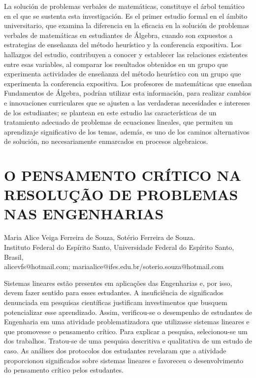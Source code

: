 La solución de problemas verbales de matemáticas, constituye el árbol
temático en el que se sustenta esta investigación. Es el primer estudio
formal en el ámbito universitario, que examina la diferencia en la
eficacia en la solución de problemas verbales de matemáticas en estudiantes
de Álgebra, cuando son expuestos a estrategias de enseñanza del método
heurístico y la conferencia expositiva. Los hallazgos del estudio,
contribuyen a conocer y establecer las relaciones existentes entre
esas variables, al comparar los resultados obtenidos en un grupo que
experimenta actividades de enseñanza del método heurístico con un
grupo que experimenta la conferencia expositiva. Los profesores de
matemáticas que enseñan Fundamentos de Álgebra, podrían utilizar esta
información, para realizar cambios e innovaciones curriculares que
se ajusten a las verdaderas necesidades e intereses de los estudiantes;
se plantean en este estudio las características de un tratamiento
adecuado de problemas de ecuaciones lineales, que permiten un aprendizaje
significativo de los temas, además, es uno de los caminos alternativos
de solución, no necesariamente enmarcados en procesos algebraicos. 


\section{O PENSAMENTO CRÍTICO NA RESOLUÇÃO DE PROBLEMAS NAS ENGENHARIAS}

\begin{datos}
Maria Alice Veiga Ferreira de Souza, Sotério Ferreira de Souza.\\
Instituto Federal do Espírito Santo, Universidade Federal do Espírito Santo,\\
Brasil,\\
\hfill  alicevfs@hotmail.com; mariaalice@ifes.edu.br/soterio.souza@hotmail.com 
\end{datos}

Sistemas lineares estão presentes em aplicações das Engenharias e,
por isso, devem fazer sentido para esses estudantes. A insuficiência
de significados denunciada em pesquisas científicas justificam investimentos
que busquem potencializar esse aprendizado. Assim, verificou-se o
desempenho de estudantes de Engenharia em uma atividade problematizadora
que utilizasse sistemas lineares e que promovesse o pensamento crítico.
Para explicar a pesquisa, selecionou-se um dos trabalhos. Tratou-se
de uma pesquisa descritiva e qualitativa de um estudo de caso. As
análises dos protocolos dos estudantes revelaram que a atividade proporcionou
significados sobre sistemas lineares e favoreceu o desenvolvimento
do pensamento crítico pelos estudantes.


